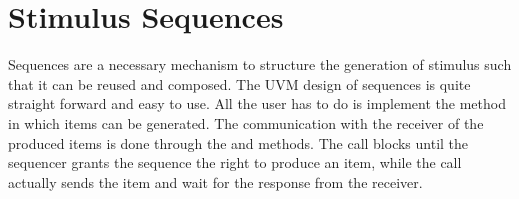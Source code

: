 \section{Stimulus Sequences} %
\label{sec:stimulus_sequences}

Sequences are a necessary mechanism to structure the generation of stimulus such that it can be reused and composed.
The UVM design of sequences is quite straight forward and easy to use. All the user has to do is implement the
 method in which items can be generated. The communication with the receiver of the produced items is done
through the  and  methods. The  call blocks until the sequencer
grants the sequence the right to produce an item, while the  call actually sends the item and wait
for the response from the receiver.


